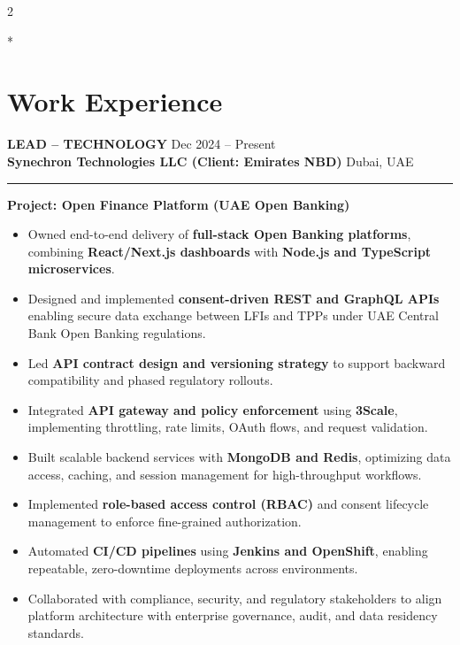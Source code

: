 \documentclass[10pt,a4paper]{article}
\newcommand{\roleheader}[4]{%
  \noindent
  \textbf{\MakeUppercase{#3}}%
  \hfill
  \textcolor{secondary}{#4}\\[0pt]
  \noindent
  \textbf{#1}%
  \hfill
  \textcolor{secondary}{#2}\\[0pt]
}
\newcommand{\roledivider}{%
  \vspace{-1pt}%
  {\color{rulecolor}\rule{\linewidth}{0.5pt}}%
  \vspace{2pt}%
}
\newcommand{\projecttitle}[1]{\textbf{#1}\par\vspace{2pt}}
\begin{document}
\begin{paracol}{2}

\switchcolumn[0]*
\section*{Work Experience}

\roleheader{Synechron Technologies LLC (Client: Emirates NBD)}{Dubai, UAE}{Lead -- Technology}{Dec 2024 -- Present}
\roledivider

\projecttitle{Project: Open Finance Platform (UAE Open Banking)}

\begin{itemize}
  \item Owned end-to-end delivery of \textbf{full-stack Open Banking platforms}, combining \textbf{React/Next.js dashboards} with \textbf{Node.js and TypeScript microservices}.
  \item Designed and implemented \textbf{consent-driven REST and GraphQL APIs} enabling secure data exchange between LFIs and TPPs under UAE Central Bank Open Banking regulations.
  \item Led \textbf{API contract design and versioning strategy} to support backward compatibility and phased regulatory rollouts.
  \item Integrated \textbf{API gateway and policy enforcement} using \textbf{3Scale}, implementing throttling, rate limits, OAuth flows, and request validation.
  \item Built scalable backend services with \textbf{MongoDB and Redis}, optimizing data access, caching, and session management for high-throughput workflows.
  \item Implemented \textbf{role-based access control (RBAC)} and consent lifecycle management to enforce fine-grained authorization.
  \item Automated \textbf{CI/CD pipelines} using \textbf{Jenkins and OpenShift}, enabling repeatable, zero-downtime deployments across environments.
  \item Collaborated with compliance, security, and regulatory stakeholders to align platform architecture with enterprise governance, audit, and data residency standards.
\end{itemize}


\end{paracol}
\end{document}
